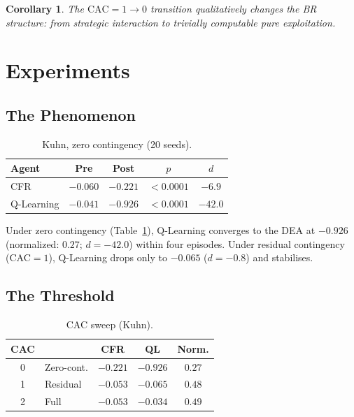 \documentclass[sigconf,anonymous]{acmart}
\newtheorem{corollary}{Corollary}
\begin{document}
\begin{corollary}
The $\mathrm{CAC}=1\to0$ transition qualitatively changes the BR structure: from strategic interaction to trivially computable pure exploitation.
\end{corollary}

\section{Experiments}

\subsection{The Phenomenon}

\begin{table}[t]
\centering
\caption{Kuhn, zero contingency (20 seeds).}
\label{tab:kuhn-full}
\begin{tabular}{lcccc}
\toprule
Agent & Pre & Post & $p$ & $d$ \\
\midrule
CFR & $-0.060$ & $-0.221$ & ${<}0.0001$ & $-6.9$ \\
Q-Learning & $-0.041$ & $\mathbf{-0.926}$ & ${<}0.0001$ & $-42.0$ \\
\bottomrule
\end{tabular}
\end{table}

Under zero contingency (Table~\ref{tab:kuhn-full}), Q-Learning converges to the DEA at $-0.926$ (normalized: $0.27$; $d=-42.0$) within four episodes. Under residual contingency (CAC$=1$), Q-Learning drops only to $-0.065$ ($d=-0.8$) and stabilises.

\subsection{The Threshold}

\begin{table}[t]
\centering
\caption{CAC sweep (Kuhn).}
\label{tab:capacity}
\begin{tabular}{clccc}
\toprule
CAC & & CFR & QL & Norm. \\
\midrule
0 & Zero-cont. & $-0.221$ & $\mathbf{-0.926}$ & $0.27$ \\
1 & Residual & $-0.053$ & $-0.065$ & $0.48$ \\
2 & Full & $-0.053$ & $-0.034$ & $0.49$ \\
\bottomrule
\end{tabular}
\end{table}
\end{document}
